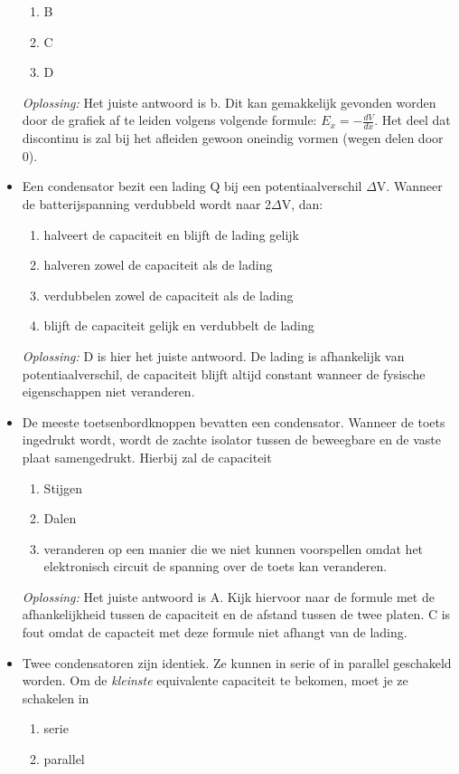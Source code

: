 \documentclass[12pt,a4paper]{article}
\begin{document}
\begin{itemize}
\begin{enumerate}[label=\alph*]
		\item B
		\item C
		\item D
	\end{enumerate}
	\textit{Oplossing:} Het juiste antwoord is b. Dit kan gemakkelijk gevonden worden door de grafiek af te leiden volgens volgende formule: \(E_x = -\frac{dV}{dx}\). Het deel dat discontinu is zal bij het afleiden gewoon oneindig vormen (wegen delen door 0).
	\item Een condensator bezit een lading Q bij een potentiaalverschil $\Delta$V. Wanneer de batterijspanning verdubbeld wordt naar 2$\Delta$V, dan:
	\begin{enumerate}[label=\alph*]
		\item halveert de capaciteit en blijft de lading gelijk
		\item halveren zowel de capaciteit als de lading
		\item verdubbelen zowel de capaciteit als de lading
		\item blijft de capaciteit gelijk en verdubbelt de lading
	\end{enumerate}
	\textit{Oplossing:} D is hier het juiste antwoord. De lading is afhankelijk van potentiaalverschil, de capaciteit blijft altijd constant wanneer de fysische eigenschappen niet veranderen.
	\item De meeste toetsenbordknoppen bevatten een condensator. Wanneer de toets ingedrukt wordt, wordt de zachte isolator tussen de beweegbare en de vaste plaat samengedrukt. Hierbij zal de capaciteit
	\begin{enumerate}[label=\alph*]
		\item Stijgen
		\item Dalen
		\item veranderen op een manier die we niet kunnen voorspellen omdat het elektronisch circuit de spanning over de toets kan veranderen. 
	\end{enumerate}
	\textit{Oplossing:} Het juiste antwoord is A. Kijk hiervoor naar de formule met de afhankelijkheid tussen de capaciteit en de afstand tussen de twee platen. C is fout omdat de capacteit met deze formule niet afhangt van de lading. 
	\item Twee condensatoren zijn identiek. Ze kunnen in serie of in parallel geschakeld worden. Om de \textit{kleinste} equivalente capaciteit te bekomen, moet je ze schakelen in
	\begin{enumerate}[label=\alph*]
		\item serie
		\item parallel

\end{enumerate}
\end{itemize}
\end{document}
